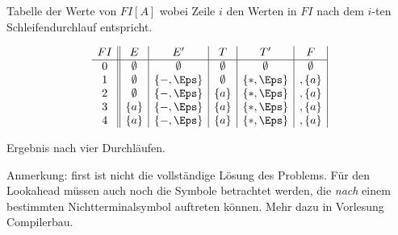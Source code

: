 {Tabelle der Werte von $FI[A]$ wobei Zeile $i$ den Werten in $FI$ nach
dem $i$-ten Schleifendurchlauf entspricht.

\begin{displaymath}
  \begin{array}{c||c|c|c|c|c|}
    FI & E & E' & T & T' & F \\\hline
    0  & \emptyset & \emptyset & \emptyset & \emptyset & \emptyset \\
    1  & \emptyset & \{ -, \Eps \} & \emptyset & \{ *, \Eps \} & , \{a\} \\
    2  & \emptyset & \{ -, \Eps \} & \{a\} & \{ *, \Eps \} & , \{a\} \\
    3  & \{a\} & \{ -, \Eps \} & \{a\} & \{ *, \Eps \} & , \{a\} \\
    4  & \{a\} & \{ -, \Eps \} & \{a\} & \{ *, \Eps \} & , \{a\} \\
  \end{array}
\end{displaymath}

Ergebnis nach vier Durchläufen. 

Anmerkung: first ist nicht die vollständige Lösung des Problems. Für
den Lookahead müssen auch noch die Symbole betrachtet werden, die
\emph{nach} einem bestimmten Nichtterminalsymbol auftreten können. Mehr dazu
in Vorlesung Compilerbau. 
}

